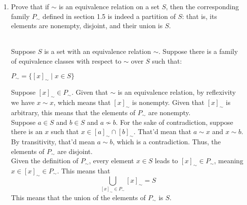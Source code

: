 \documentclass{article}
\begin{document}
\begin{enumerate}
\item Prove that if $\sim$ is an equivalence relation on a set $S$, then the corresponding family $P_{\sim}$ defined in section 1.5 is indeed a partition of $S$: that is, its elements are nonempty, disjoint, and their union is $S$.\\
    \\
    Suppose $S$ is a set with an equivalence relation $\sim$. Suppose there is a family of equivalence classes with respect to $\sim$ over $S$ such that:
    \begin{center}
        $P_{\sim} = \{[x]_{\sim} \mid x \in S \}$
    \end{center}
    Suppose $[x]_{\sim} \in P_{\sim}$. Given that $\sim$ is an equivalence relation, by reflexivity we have $x \sim x$, which means that $[x]_{\sim}$ is nonempty. Given that $[x]_{\sim}$ is arbitrary, this means that the elements of $P_{\sim}$ are nonempty.\\

    \noindent Suppose $a \in S$ and $b \in S$ and $a \not\sim b$. For the sake of contradiction, suppose there is an $x$ such that $x \in [a]_{\sim} \cap [b]_{\sim}$. That'd mean that $a \sim x$ and $x \sim b$. By transitivity, that'd mean $a \sim b$, which is a contradiction. Thus, the elements of $P_{\sim}$ are disjoint.\\
    
    \noindent Given the definition of $P_{\sim}$, every element $x \in S$ leads to $[x]_{\sim} \in P_{\sim}$, meaning $x \in [x]_{\sim} \in P_{\sim}$. This means that 
    \[
        \bigcup_{[x]_{\sim} \in P_{\sim}} [x]_{\sim} = S
    \] 
    This means that the union of the elements of $P_{\sim}$ is $S$.
\end{enumerate}

\clearpage
\printglossary[type=\acronymtype,style=long]  %
\printglossary[type=symbolslist,style=long]   %
\printglossary[type=main]                     %
\end{document}
